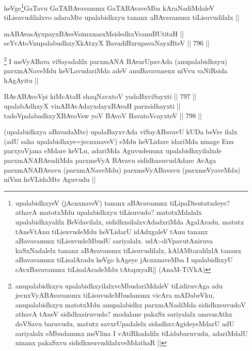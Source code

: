 \begin{artha}
heVge\footnote{upalabidhxyeV (jAcnxnaveV) tananx aBAvavanunx tiLipaDisutatxdeye? athavA matotxMdu upalabidhxyu tiLisuvudo? matotxMdalalx upalabidhxyalilx BeVdavilalx, sididhxsilalxvAdadxriMda AgalAradu, matutx tAneVtAnu tiLisuvudeMdu heVLidarU idAdxgaleV tAnu tananx aBavavanunx tiLisuvudeMbudU sariyalalx. udA:-diVpavutAniruva kaSxNadalelx tananx aBAvavanunx tiLisuvudilalx, kAlAMtaralilxlA tananx aBavavanunx tiLisalAradu heVgo hAgeye jAcnxnaveMba I upalabidhxyU sAvxBavavanunx tiLisalAradeMdu tAtapxyaR|| (AnaM-TiVkA)}GaTavu GaTABAvavanunx GaTABAvaveMba kAraNadiMdaleV tiLisuvudilalxvo adaraMte upalabidhxyu tananx aBAvavanunx tiLisuvudilalx ||
\end{artha}

\begin{shl}
mABAvasAyxpayxBAveV\s simxnasxMsidedhxVranuBUtitaH || \\
seYvAtoV\s nupalabudhxyXkAtxyX BavadiBxrupavaNayxRteV ||  796 ||  
\end{shl}

\begin{artha}
\footnote{anupalabidhxyu upalabidhxyilalxveMbudariMdaleV tiLidiruvAga adu jecnxVyABAvavanunx tiLisuvudeMbudanunx vicAra mADabeVku, anupalabidhxyu matotxMdu anupalabidhx parxmANadiMda sididhxsuvudoV athavA tAneV sididhxsiruvudo? modalane pakaSx sariyalalx anavasAthx doVSavu baruvudu, matutx savxrUpadalelx sidadhxvAgideyeMdarU adU sariyalalx eMbudanunx meVlina I vAtiRkadalilx tiLidubaruvudu, adariMdalU ninanx pakaSxvu sididhxsuvudilalxveMdathaR ||}
I meVyABava viSayadalilx parxmANA BAvarUpavAda (anupalabidhxyu) parxmANaveMdu heVLavudariMda adeV anuBavavanenx niVvu vaNiRsida hAgAyitu ||
\end{artha}


\begin{shl}
BAvABAvoV\s pi kiMcAtaH shaqNavxtoV yadaBxviSayxti ||  797 ||  \\
upalabAdhxyX vinA\s BAvAdayxdayxBAvaH parxsidhayxti || \\
tadoVpalabadhxyXBAvoV\s sw yoV BAvoV BavatoVcayxteV ||  798 ||  
\end{shl}

\begin{artha}
(upalabidhxya aBavadaMte) upalaBayxvAda viSayABavavU kUDa beVre ilalx (adU saha upalabidhxye=jecnxnaveV) eMdu heVLidare idariMda ninage Enu parxyoVjana eMdare keVLu, adariMda Aguvudenunx upalabidhxyilalxde parxmANABAvadiMda parxmeVyA BAvavu sididhxsuvudAdare AvAga parxmANABAvavu (parxmANaveMdu) parxmeVyABavavu (parxmeVyaveMdu) niVnu heVLidaMte Aguvudu ||
\end{artha}

